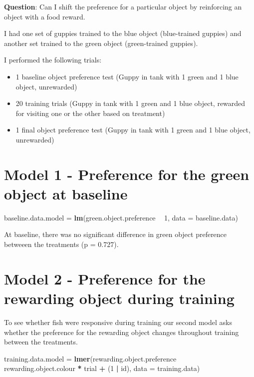 \documentclass[]{book}
\newenvironment{Shaded}{\begin{snugshade}}{\end{snugshade}}
\newcommand{\KeywordTok}[1]{\textcolor[rgb]{0.13,0.29,0.53}{\textbf{#1}}}
\newcommand{\DataTypeTok}[1]{\textcolor[rgb]{0.13,0.29,0.53}{#1}}
\newcommand{\DecValTok}[1]{\textcolor[rgb]{0.00,0.00,0.81}{#1}}
\newcommand{\StringTok}[1]{\textcolor[rgb]{0.31,0.60,0.02}{#1}}
\newcommand{\OperatorTok}[1]{\textcolor[rgb]{0.81,0.36,0.00}{\textbf{#1}}}
\newcommand{\NormalTok}[1]{#1}
\providecommand{\tightlist}{%
  \setlength{\itemsep}{0pt}\setlength{\parskip}{0pt}}
\begin{document}
\textbf{Question}: Can I shift the preference for a particular object by
reinforcing an object with a food reward.

I had one set of guppies trained to the blue object (blue-trained
guppies) and another set trained to the green object (green-trained
guppies).

I performed the following trials:

\begin{itemize}
\tightlist
\item
   1 baseline object preference test (Guppy in tank with 1 green and 1
  blue object, unrewarded)
\item
   20 training trials (Guppy in tank with 1 green and 1 blue object,
  rewarded for visiting one or the other based on treatment)
\item
   1 final object preference test (Guppy in tank with 1 green and 1 blue
  object, unrewarded)
\end{itemize}

\chapter{Model 1 - Preference for the green object at
baseline}\label{model-1---preference-for-the-green-object-at-baseline}

\begin{Shaded}
\begin{Highlighting}[]
\NormalTok{baseline.data.model =}\StringTok{ }
\StringTok{  }\KeywordTok{lm}\NormalTok{(green.object.preference }\OperatorTok{~}\StringTok{ }\DecValTok{1}\NormalTok{,}
     \DataTypeTok{data =}\NormalTok{ baseline.data)}
\end{Highlighting}
\end{Shaded}

At baseline, there was no significant difference in green object
preference betweeen the treatments (p = 0.727).

\chapter{Model 2 - Preference for the rewarding object during
training}\label{model-2---preference-for-the-rewarding-object-during-training}

To see whether fish were responsive during training our second model
asks whether the preference for the rewarding object changes throughout
training between the treatments.

\begin{Shaded}
\begin{Highlighting}[]
\NormalTok{training.data.model =}\StringTok{ }
\StringTok{  }\KeywordTok{lmer}\NormalTok{(rewarding.object.preference }\OperatorTok{~}\StringTok{ }\NormalTok{rewarding.object.colour }\OperatorTok{*}\StringTok{ }\NormalTok{trial }\OperatorTok{+}\StringTok{ }\NormalTok{(}\DecValTok{1} \OperatorTok{|}\StringTok{ }\NormalTok{id), }
       \DataTypeTok{data =}\NormalTok{ training.data)}
\end{Highlighting}
\end{Shaded}
\end{document}
